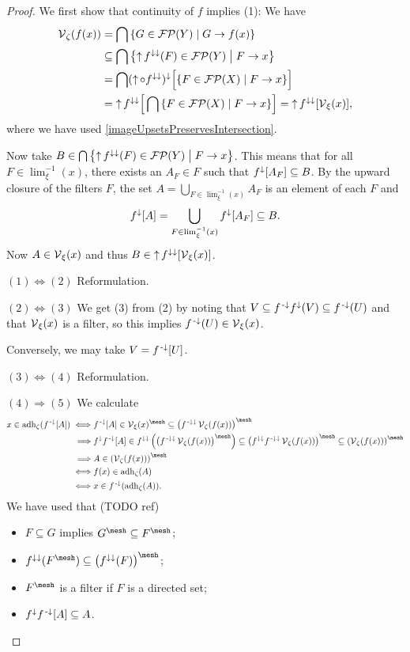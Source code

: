 \begin{proof}
We first show that continuity of $f$ implies (1): We have
\begin{align*}
\vicinity_\zeta(f(x)) &= \bigcap\setbuilder{G\in\powerfilters(Y)}{G\to f(x)} \\
&\subseteq \bigcap\setbuilder{\upset f^{\imf\imf}(F)\in\powerfilters(Y)}{F\to x} \\
&= \bigcap (\upset\circ f^{\imf\imf})^{\imf}\Big[\setbuilder{F\in\powerfilters(X)}{F\to x}\Big] \\
&= \upset f^{\imf\imf}\Big[\bigcap \setbuilder{F\in\powerfilters(X)}{F\to x}\Big] = \upset f^{\imf\imf}[\vicinity_\xi(x)],
\end{align*}
where we have used \ref{imageUpsetsPreservesIntersection}.

Now take $B\in \bigcap\setbuilder{\upset f^{\imf\imf}(F)\in\powerfilters(Y)}{F\to x}$. This means that for all $F\in\lim^{-1}_\xi(x)$, there exists an $A_F\in F$ such that $f^\downarrow[A_F]\subseteq B$. By the upward closure of the filters $F$, the set $A = \bigcup_{F\in \lim^{-1}_\xi(x)}A_F$ is an element of each $F$ and
\[ f^\downarrow[A] = \bigcup_{F\in \lim^{-1}_\xi(x)}f^{\downarrow}[A_F] \subseteq B.  \]
Now $A\in \operatorname{\mathcal{V}}_\xi(x)$ and thus $B\in \operatorname{\uparrow} f^{\downarrow\downarrow}[\operatorname{\mathcal{V}}_\xi(x)]$.


$(1) \Leftrightarrow (2)$ Reformulation.

$(2) \Leftrightarrow (3)$ We get (3) from (2) by noting that $V\subseteq f^{{\text{\hspace{0.15em}-}\downarrow}}f^\downarrow(V) \subseteq f^{\text{\hspace{0.15em}-}\downarrow}(U)$ and that $\operatorname{\mathcal{V}}_\xi(x)$ is a filter, so this implies $f^{\text{\hspace{0.15em}-}\downarrow}(U)\in \operatorname{\mathcal{V}}_\xi(x)$.

Conversely, we may take $V = f^{{\text{\hspace{0.15em}-}\downarrow}}[U]$.

$(3) \Leftrightarrow (4)$ Reformulation.

$(4) \Rightarrow (5)$ We calculate
\begin{align*}
x\in \adh_\zeta(f^\preimf[A]) \iff& f^\preimf[A]\in \vicinity_\xi(x)^{\mesh} \subseteq \left(f^{\preimf\imf}\vicinity_\zeta(f(x))\right)^{\mesh} \\
\implies& f^\imf f^\preimf[A] \in f^{\imf\imf}\left(\left(f^{\preimf\imf}\vicinity_\zeta(f(x))\right)^{\mesh}\right) \subseteq \left(f^{\imf\imf} f^{\preimf\imf}\vicinity_\zeta(f(x))\right)^{\mesh} \subseteq \left(\vicinity_\zeta(f(x))\right)^{\mesh} \\
\implies& A \in \left(\vicinity_\zeta(f(x))\right)^{\mesh} \\
\iff& f(x)\in \adh_\zeta(A) \\
\iff& x\in f^{\preimf}(\adh_\zeta(A)).
\end{align*}
We have used that (TODO ref)
\begin{itemize}
\item $F\subseteq G$ implies $G^{\mesh} \subseteq F^{\mesh}$;
\item $f^{\imf\imf}(F^{\mesh}) \subseteq \left(f^{\imf\imf}(F)\right)^{\mesh}$;
\item $F^{\mesh}$ is a filter if $F$ is a directed set;
\item $f^\downarrow f^{\text{\hspace{0.15em}-}\downarrow}[A] \subseteq A$.
\end{itemize}


\end{proof}
